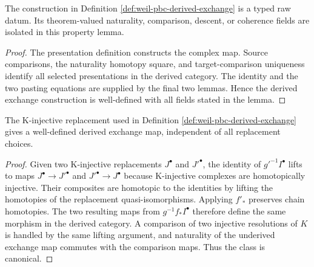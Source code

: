 \begin{lemma}
\label{lemma:weil-sf-well-defined-def-weil-pbc-derived-exchange}
The construction in Definition \ref{def:weil-pbc-derived-exchange} is a typed raw datum.  Its theorem-valued naturality, comparison, descent, or coherence fields are isolated in this property lemma.
\end{lemma}
\begin{proof}
The presentation definition constructs the complex map.  Source comparisons,
the naturality homotopy square, and target-comparison uniqueness identify all
selected presentations in the derived category.  The identity and the two
pasting equations are supplied by the final two lemmas.  Hence the derived
exchange construction is well-defined with all fields stated in the lemma.
\end{proof}
\begin{lemma}
\label{lemma:weil-pbc-derived-exchange-replacement}
\leanok
The K-injective replacement used in Definition
\ref{def:weil-pbc-derived-exchange} gives a well-defined derived exchange
map, independent of all replacement choices.
\end{lemma}
\begin{proof}
\leanok
Given two K-injective replacements $J^\bullet$ and $J'^\bullet$, the identity
of $g'^{-1}I^\bullet$ lifts to maps $J^\bullet\to J'^\bullet$ and
$J'^\bullet\to J^\bullet$ because K-injective complexes are homotopically
injective.  Their composites are homotopic to the identities by lifting the
homotopies of the replacement quasi-isomorphisms.  Applying $f'_*$ preserves
chain homotopies.  The two resulting maps from
$g^{-1}f_*I^\bullet$ therefore define the same morphism in the derived
category.  A comparison of two injective resolutions of $K$ is handled by
the same lifting argument, and naturality of the underived exchange map
commutes with the comparison maps.  Thus the class is canonical.
\end{proof}


